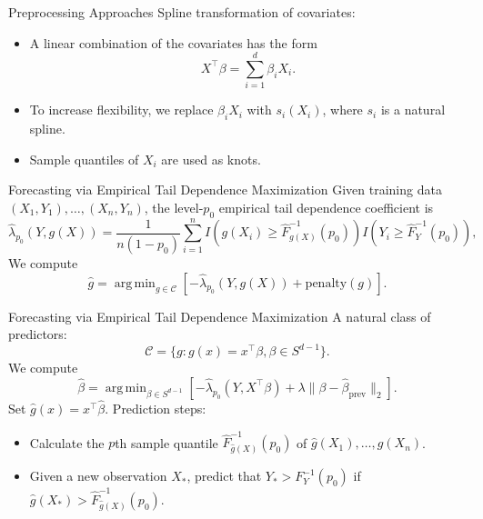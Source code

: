 \documentclass{beamer}
\DeclareMathOperator*{\argmin}{arg\,min}
\begin{document}
\begin{frame}{Preprocessing Approaches}
    Spline transformation of covariates:
    \begin{itemize}
        \item A linear combination of the covariates has the form
        \[
        X^{\top}\beta = \sum_{i = 1}^d \beta_i X_i.
        \]
        \item To increase flexibility, we replace $\beta_i X_i$ with $s_i(X_i)$, where $s_i$ is a natural spline.
        \item Sample quantiles of $X_i$ are used as knots.
    \end{itemize}
\end{frame}

\begin{frame}{Forecasting via Empirical Tail Dependence Maximization}
    Given training data $(X_1, Y_1), \ldots, (X_n, Y_n)$, the level-$p_0$ empirical tail dependence coefficient is
    \[
    \hat{\lambda}_{p_0}(Y, g(X)) = \frac{1}{n(1 - p_0)}\sum_{i = 1}^n I(g(X_i) \ge \hat{F}_{g(X)}^{-1}(p_0))I(Y_i \ge \hat{F}_{Y}^{-1}(p_0)),
    \]
    We compute
    \[
    \hat{g} = \argmin_{g \in \mathcal{C}} \left[-\hat{\lambda}_{p_0}(Y, g(X)) + \text{penalty}(g)\right].
    \]
\end{frame}

\begin{frame}{Forecasting via Empirical Tail Dependence Maximization}
    A natural class of predictors:
    \[
    \mathcal{C} = \{g : g(x) = x^{\top}\beta, \beta \in S^{d - 1}\}.
    \]
    We compute
    \[
    \hat{\beta} = \argmin_{\beta \in S^{d - 1}} \left[-\hat{\lambda}_{p_0}(Y, X^{\top}\beta) + \lambda\|\beta - \hat{\beta}_{\text{prev}}\|_2\right].
    \]
    Set $\hat{g}(x) = x^{\top}\hat{\beta}$. Prediction steps:
    \begin{itemize}
        \item Calculate the $p$th sample quantile $\hat{F}_{\hat{g}(X)}^{-1}(p_0)$ of $\hat{g}(X_1), \ldots, \hat{g}(X_n)$.
        \item Given a new observation $X_*$, predict that $Y_* > F_{Y}^{-1}(p_0)$ if $\hat{g}(X_*) > \hat{F}_{\hat{g}(X)}^{-1}(p_0)$.
    \end{itemize}
\end{frame}
\end{document}

